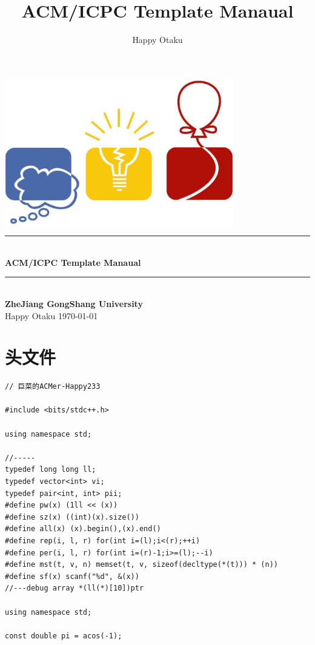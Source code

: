 \documentclass[twoside]{article}
\title{ACM/ICPC Template Manaual}
\author{Happy Otaku}
\newcommand{\HRule}{\rule{\linewidth}{0.5mm}}
\begin{document}
\small
\begin{titlepage}
\begin{center}
\vspace*{0.5cm}\includegraphics[width=0.75\textwidth]{logo.jpg} \\ [2cm]
\HRule \\ [1cm]
\textbf{\Huge{ACM/ICPC Template Manaual}} \\ [0.5cm]
\HRule \\ [4cm]
\textbf{\Huge{ZheJiang GongShang University}} \\ [1cm]
\LARGE{Happy Otaku}
\vfill
\Large{\today}
\end{center}
\clearpage
\end{titlepage}
\tableofcontents\clearpage
\pagestyle{fancy}
\lfoot{}
\cfoot{\thepage}\rfoot{}
\setcounter{section}{-1}
\setcounter{page}{1}
\clearpage\section{头文件}
\begin{lstlisting}
// 巨菜的ACMer-Happy233

#include <bits/stdc++.h>

using namespace std;

//-----
typedef long long ll;
typedef vector<int> vi;
typedef pair<int, int> pii;
#define pw(x) (1ll << (x))
#define sz(x) ((int)(x).size())
#define all(x) (x).begin(),(x).end()
#define rep(i, l, r) for(int i=(l);i<(r);++i)
#define per(i, l, r) for(int i=(r)-1;i>=(l);--i)
#define mst(t, v, n) memset(t, v, sizeof(decltype(*(t))) * (n))
#define sf(x) scanf("%d", &(x))
//---debug array *(ll(*)[10])ptr

using namespace std;

const double pi = acos(-1);\end{lstlisting}
\end{document}
